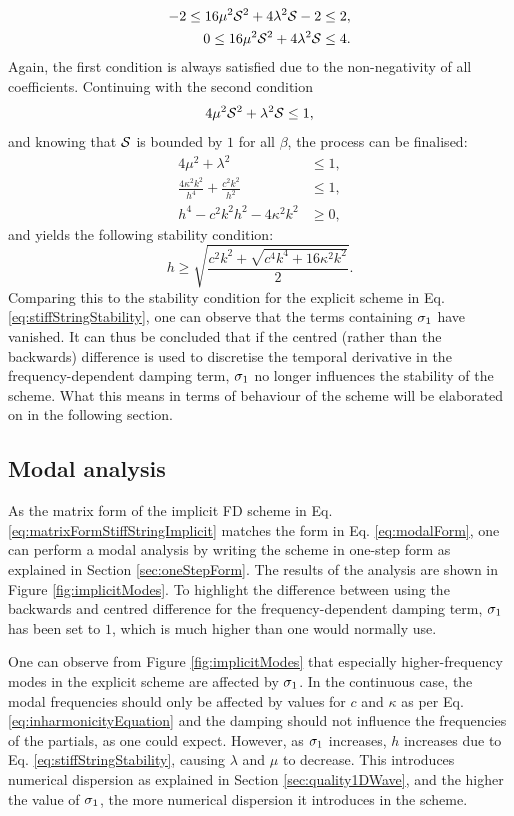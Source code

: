 {\begin{align*}
    -2\leq 16\mu^2\S^2+4\lambda^2\S - 2 &\leq 2,\\
    0\leq 16\mu^2\S^2+4\lambda^2\S &\leq 4.
\end{align*}
Again, the first condition is always satisfied due to the non-negativity of all coefficients. Continuing with the second condition
\begin{equation*}
    4\mu^2\S^2+\lambda^2\S \leq 1,
\end{equation*} 
and knowing that $\S$ is bounded by $1$ for all $\beta$, the process can be finalised:
\begin{align*}
    4\mu^2+\lambda^2 &\leq 1,\\
    \frac{4\kappa^2k^2}{h^4}+\frac{c^2k^2}{h^2} &\leq 1,\\
    h^4 - c^2k^2h^2 - 4\kappa^2k^2 &\geq 0,
\end{align*}
and yields the following stability condition:
\begin{equation}\label{eq:implicitStability}
    h \geq \sqrt{\frac{c^2k^2 + \sqrt{c^4k^4 + 16\kappa^2k^2}}{2}}.
\end{equation}
Comparing this to the stability condition for the explicit scheme in Eq. \eqref{eq:stiffStringStability}, one can observe that the terms containing $\so$ have vanished. It can thus be concluded that if the centred (rather than the backwards) difference is used to discretise the temporal derivative in the frequency-dependent damping term, $\so$ no longer influences the stability of the scheme. What this means in terms of behaviour of the scheme will be elaborated on in the following section.

\subsection{Modal analysis}
As the matrix form of the implicit FD scheme in Eq. \eqref{eq:matrixFormStiffStringImplicit} matches the form in Eq. \eqref{eq:modalForm}, one can perform a modal analysis by writing the scheme in one-step form as explained in Section \ref{sec:oneStepForm}. The results of the analysis are shown in Figure \ref{fig:implicitModes}. To highlight the difference between using the backwards and centred difference for the frequency-dependent damping term, $\so $ has been set to $1$, which is much higher than one would normally use.

One can observe from Figure \ref{fig:implicitModes} that especially higher-frequency modes in the explicit scheme are affected by $\so$.  
In the continuous case, the modal frequencies should only be affected by values for $c$ and $\kappa$ as per Eq. \eqref{eq:inharmonicityEquation} and the damping should not influence the frequencies of the partials, as one could expect. However, as $\so$ increases, $h$ increases due to Eq. \eqref{eq:stiffStringStability}, causing $\lambda$ and $\mu$ to decrease. This introduces numerical dispersion as explained in Section \ref{sec:quality1DWave}, and the higher the value of $\so$, the more numerical dispersion it introduces in the scheme.

}
